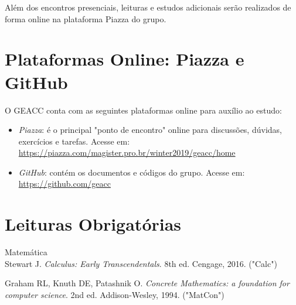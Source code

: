 \documentclass[a4paper]{inzane_syllabus} %
\begin{document}
Além dos encontros presenciais, leituras e estudos adicionais serão realizados
de forma online na plataforma Piazza do grupo.


\vspace{0.5cm}
\section{Plataformas Online: Piazza e GitHub}

O GEACC conta com as seguintes plataformas online para auxílio ao estudo:
\begin{itemize}
\item \emph{Piazza}: é o principal "ponto de encontro" online para discussões,
dúvidas, exercícios e tarefas. Acesse em:\\
\url{https://piazza.com/magister.pro.br/winter2019/geacc/home}
\vspace{0.2cm}
\item \emph{GitHub}: contém os documentos e códigos do grupo. Acesse em:\\
\url{https://github.com/geacc}
\end{itemize}



\newpage 

\makeSide 


\section{Leituras Obrigatórias}

{\color{myCOLOR} Matemática}\\
Stewart J. \emph{Calculus: Early Transcendentals}. 8th ed. Cengage, 2016. ("Calc")

Graham RL, Knuth DE, Patashnik O. \emph{Concrete Mathematics: a foundation for
computer science}. 2nd ed. Addison-Wesley, 1994. ("MatCon")
\end{document}

